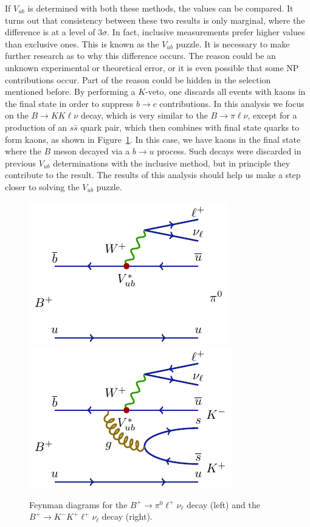 \documentclass[  headings=standardclasses,
  headings=big,oneside,a4paper,openany,12pt]{scrbook}
\begin{document}
If $V_{ub}$ is determined with both these methods, the values can be compared. It turns out that consistency between these two results is only marginal, where the difference is at a level of $3\sigma$. In fact, inclusive measurements prefer higher values than exclusive ones. This is known as the $V_{ub}$ puzzle. It is necessary to make further research as to why this difference occurs. The reason could be an unknown experimental or theoretical error, or it is even possible that some NP contributions occur. Part of the reason could be hidden in the selection mentioned before. By performing a $K$-veto, one discards all events with kaons in the final state in order to suppress $b \rightarrow c$ contributions. In this analysis we focus on the $B \rightarrow K K \ell \nu$ decay, which is very similar to the $B \rightarrow \pi \ell \nu$, except for a production of an $s \bar s$ quark pair, which then combines with final state quarks to form kaons, as shown in Figure~\ref{feynman}. In this case, we have kaons in the final state where the $B$ meson decayed via a $b \rightarrow u$ process. Such decays were discarded in previous $V_{ub}$ determinations with the inclusive method, but in principle they contribute to the result. The results of this analysis should help us make a step closer to solving the $V_{ub}$ puzzle.

\begin{figure}[H]
\centering
\includegraphics{texfig/B2pilnu}
\hspace{1cm}
\includegraphics{texfig/B2KKlnu}
\caption{Feynman diagrams for the $B^+ \to \pi^0 \ell^+ \nu_\ell$ decay (left) and the $B^+ \to K^- K^+ \ell^+ \nu_\ell$ decay (right).}
\label{feynman}
\end{figure}
\end{document}
